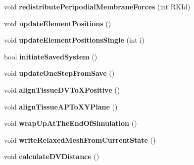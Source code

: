 \begin{DoxyCompactItemize}
\item 
\hypertarget{classSimulation_a0f2aafedd2ceaab7ef60b9493aa98b21}{}void {\bfseries redistribute\+Peripodial\+Membrane\+Forces} (int R\+K\+Id)\label{classSimulation_a0f2aafedd2ceaab7ef60b9493aa98b21}

\item 
\hypertarget{classSimulation_aa92f90b98dc049a3206b4906ebf52585}{}void {\bfseries update\+Element\+Positions} ()\label{classSimulation_aa92f90b98dc049a3206b4906ebf52585}

\item 
\hypertarget{classSimulation_ab9fc29a2decb03a07e31e3ebb8801aec}{}void {\bfseries update\+Element\+Positions\+Single} (int i)\label{classSimulation_ab9fc29a2decb03a07e31e3ebb8801aec}

\item 
\hypertarget{classSimulation_a6ef90fd76ed4f6bb9d063e7e72e9a983}{}bool {\bfseries initiate\+Saved\+System} ()\label{classSimulation_a6ef90fd76ed4f6bb9d063e7e72e9a983}

\item 
\hypertarget{classSimulation_a1f5dbbde572af555225089e247296e2e}{}void {\bfseries update\+One\+Step\+From\+Save} ()\label{classSimulation_a1f5dbbde572af555225089e247296e2e}

\item 
\hypertarget{classSimulation_a91a12f6ac1b230cecbe004221326a7ca}{}void {\bfseries align\+Tissue\+D\+V\+To\+X\+Positive} ()\label{classSimulation_a91a12f6ac1b230cecbe004221326a7ca}

\item 
\hypertarget{classSimulation_a4d865136f9cb930b986af8bc86b6bd10}{}void {\bfseries align\+Tissue\+A\+P\+To\+X\+Y\+Plane} ()\label{classSimulation_a4d865136f9cb930b986af8bc86b6bd10}

\item 
\hypertarget{classSimulation_ada1776f97a899b0e77e20df658713cb3}{}void {\bfseries wrap\+Up\+At\+The\+End\+Of\+Simulation} ()\label{classSimulation_ada1776f97a899b0e77e20df658713cb3}

\item 
\hypertarget{classSimulation_ac6cb6f4e1f7060527ead71c2ce83727d}{}void {\bfseries write\+Relaxed\+Mesh\+From\+Current\+State} ()\label{classSimulation_ac6cb6f4e1f7060527ead71c2ce83727d}

\item 
\hypertarget{classSimulation_a2cdf77d01390a32cabb8ba7535a9f7dd}{}void {\bfseries calculate\+D\+V\+Distance} ()\label{classSimulation_a2cdf77d01390a32cabb8ba7535a9f7dd}


\end{DoxyCompactItemize}
